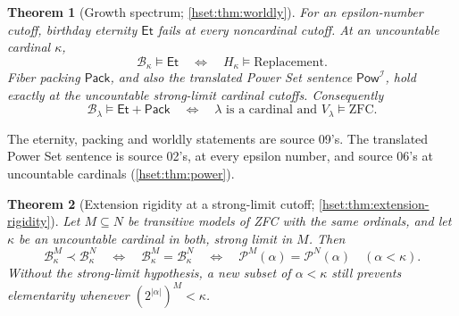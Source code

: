 \documentclass[11pt,letterpaper]{article}
\newtheorem{theorem}{Theorem}[section]
\theoremstyle{definition}
\theoremstyle{remark}
\newcommand{\B}{\mathcal B}
\newcommand{\I}{\mathcal I}
\newcommand{\Et}{\mathsf{Et}}
\newcommand{\Pack}{\mathsf{Pack}}
\newcommand{\PowI}{\mathsf{Pow}^{\I}}
\newcommand{\Pow}{\mathcal P}
\newcommand{\card}[1]{\lvert#1\rvert}
\begin{document}
\begin{theorem}[Growth spectrum; \cref{hset:thm:worldly}]
\label{hset:thm:main-growth}
For an epsilon-number cutoff, birthday eternity $\Et$ fails at every
noncardinal cutoff. At an uncountable cardinal $\kappa$,
\[
 \B_\kappa\models\Et
 \quad\Longleftrightarrow\quad
 H_\kappa\models\text{Replacement}.
\]
Fiber packing $\Pack$, and also the translated Power Set sentence $\PowI$,
hold exactly at the uncountable strong-limit cardinal cutoffs. Consequently
\[
 \B_\lambda\models\Et+\Pack
 \quad\Longleftrightarrow\quad
 \lambda\text{ is a cardinal and }V_\lambda\models\mathrm{ZFC}.
\]
\end{theorem}

The eternity, packing and worldly statements are source 09's. The translated
Power Set sentence is source 02's, at every epsilon number, and source 06's at
uncountable cardinals (\cref{hset:thm:power}).

\begin{theorem}[Extension rigidity at a strong-limit cutoff; \cref{hset:thm:extension-rigidity}]
\label{hset:thm:main-extension}
Let $M\subseteq N$ be transitive models of ZFC with the same ordinals, and let
$\kappa$ be an uncountable cardinal in both, strong limit in $M$. Then
\[
 \B_\kappa^M\prec\B_\kappa^N
 \quad\Longleftrightarrow\quad
 \B_\kappa^M=\B_\kappa^N
 \quad\Longleftrightarrow\quad
 \Pow^M(\alpha)=\Pow^N(\alpha)\quad(\alpha<\kappa).
\]
Without the strong-limit hypothesis, a new subset of $\alpha<\kappa$ still
prevents elementarity whenever $(2^{\card\alpha})^M<\kappa$.
\end{theorem}
\end{document}
